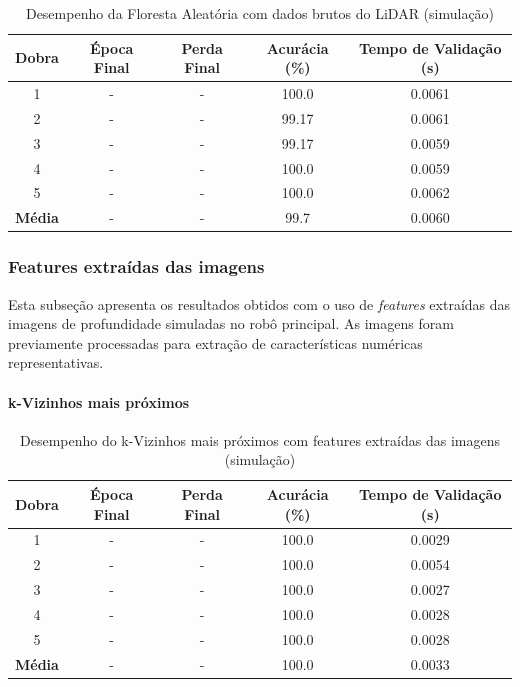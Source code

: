 \begin{table}[!h]
\centering
\caption{Desempenho da Floresta Aleatória com dados brutos do LiDAR (simulação)}
\label{tab:rede_neural_features_imagem}
\begin{tabular}{ccccc}
\hline
\textbf{Dobra} & \textbf{Época Final} & \textbf{Perda Final} & \textbf{Acurácia (\%)} & \textbf{Tempo de Validação (s)} \\
\hline
1 & - & - & 100.0  & 0.0061 \\
2 & - & - & 99.17  & 0.0061 \\
3 & - & - & 99.17  & 0.0059 \\
4 & - & - & 100.0  & 0.0059 \\
5 & - & - & 100.0  & 0.0062 \\
\hline
\textbf{Média} & - & - & 99.7 & 0.0060 \\
\hline
\end{tabular} \fonte{}
\end{table}

\subsubsection{Features extraídas das imagens}

Esta subseção apresenta os resultados obtidos com o uso de \textit{features} extraídas das imagens de profundidade simuladas no robô principal. As imagens foram previamente processadas para extração de características numéricas representativas.

\paragraph{k-Vizinhos mais próximos}

\begin{table}[H]
\centering
\caption{Desempenho do k-Vizinhos mais próximos com features extraídas das imagens (simulação)}
\label{tab:knn_feat_img_simu}
\begin{tabular}{ccccc}
\hline
\textbf{Dobra} & \textbf{Época Final} & \textbf{Perda Final} & \textbf{Acurácia (\%)} & \textbf{Tempo de Validação (s)} \\
\hline
1 & - & - & 100.0 & 0.0029 \\
2 & - & - & 100.0 & 0.0054 \\
3 & - & - & 100.0 & 0.0027 \\
4 & - & - & 100.0 & 0.0028 \\
5 & - & - & 100.0 & 0.0028 \\
\hline
\textbf{Média} & - & - & 100.0 & 0.0033 \\
\hline
\end{tabular} \fonte{}
\end{table}

